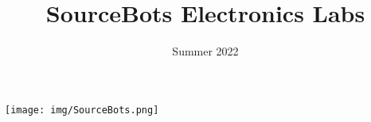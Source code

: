 \documentclass[a4paper,10pt]{article}
\title{{\titlefont SourceBots Electronics Labs}}
\date{Summer 2022}
\begin{document}
  \begin{titlepage}
    \maketitle
    \begin{center}
      \texttt{[image: img/SourceBots.png]}      
    \end{center}
  \end{titlepage}
  
  
  
  
  
  
\end{document}
